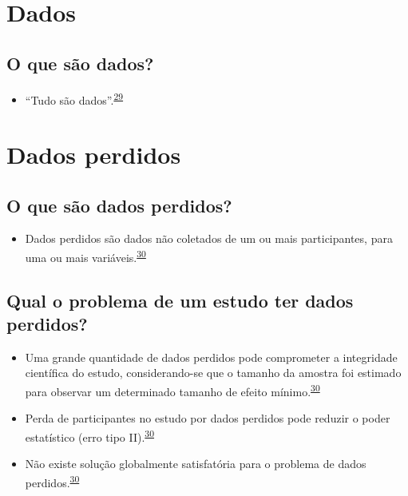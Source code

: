 \documentclass[
]{book}
\providecommand{\tightlist}{%
  \setlength{\itemsep}{0pt}\setlength{\parskip}{0pt}}
\begin{document}
\hypertarget{dados-1}{%
\section{Dados}\label{dados-1}}

\hypertarget{o-que-suxe3o-dados}{%
\subsection{O que são dados?}\label{o-que-suxe3o-dados}}

\begin{itemize}
\tightlist
\item
  ``Tudo são dados''.\textsuperscript{\protect\hyperlink{ref-Olson2021}{29}}
\end{itemize}

\hypertarget{dados-perdidos}{%
\section{Dados perdidos}\label{dados-perdidos}}

\hypertarget{o-que-suxe3o-dados-perdidos}{%
\subsection{O que são dados perdidos?}\label{o-que-suxe3o-dados-perdidos}}

\begin{itemize}
\tightlist
\item
  Dados perdidos são dados não coletados de um ou mais participantes, para uma ou mais variáveis.\textsuperscript{\protect\hyperlink{ref-Altman2007}{30}}
\end{itemize}

\hypertarget{qual-o-problema-de-um-estudo-ter-dados-perdidos}{%
\subsection{Qual o problema de um estudo ter dados perdidos?}\label{qual-o-problema-de-um-estudo-ter-dados-perdidos}}

\begin{itemize}
\item
  Uma grande quantidade de dados perdidos pode comprometer a integridade científica do estudo, considerando-se que o tamanho da amostra foi estimado para observar um determinado tamanho de efeito mínimo.\textsuperscript{\protect\hyperlink{ref-Altman2007}{30}}
\item
  Perda de participantes no estudo por dados perdidos pode reduzir o poder estatístico (erro tipo II).\textsuperscript{\protect\hyperlink{ref-Altman2007}{30}}
\item
  Não existe solução globalmente satisfatória para o problema de dados perdidos.\textsuperscript{\protect\hyperlink{ref-Altman2007}{30}}
\end{itemize}
\end{document}
